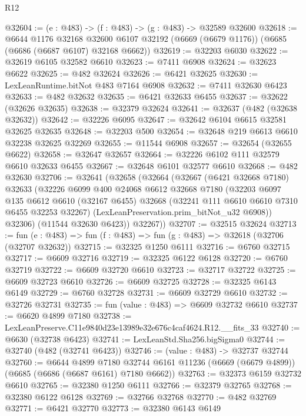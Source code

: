 \begin{lexlean}{R12}
\begin{coremodule}
@32604 := (e : @483) -> (f : @483) -> (g : @483) -> @32589 @32600
@32618 := @6644
    @1176
    @32168
    @32600
    @6107
    @32192
    (@6669 (@6679 @1176))
    (@6685 (@6686 (@6687 @6107) @32168 @6662))
@32619 := @32203 @6030
@32622 := @32619 @6105 @32582 @6610
@32623 := @7411 @6908
@32624 := @32623 @6622
@32625 := @482 @32624
@32626 := @6421 @32625
@32630 := LexLeanRuntime.bitNot @483 @7164 @6908
@32632 := @7411 @32630 @6423
@32633 := @482 @32632
@32635 := @6421 @32633 @6455
@32637 := @32622 (@32626 @32635)
@32638 := @32379 @32624
@32641 := @32637 (@482 (@32638 @32632))
@32642 := @32226 @6095
@32647 := @32642 @6104 @6615 @32581 @32625 @32635
@32648 := @32203 @500
@32654 := @32648 @219 @6613 @6610 @32238 @32625 @32269
@32655 := @11544 @6908
@32657 := @32654 (@32655 @6622)
@32658 := @32647 @32657
@32664 := @32226 @6102 @111 @32579 @6610 @32633 @6455
@32667 := @32648 @6101 @32577 @6610
@32668 := @482 @32630
@32706 := @32641
    (@32658
      (@32664
        (@32667
          (@6421 @32668 @7180)
          @32633
          (@32226
            @6099
            @400
            @24068
            @6612
            @32668
            @7180
            (@32203
              @6097
              @135
              @6612
              @6610
              (@32167 @6455)
              @32668
              (@32241 @111 @6610 @6610 @7310 @6455 @32253 @32267)
              (LexLeanPreservation.prim_bitNot_u32 @6908))
            @32306)
          (@11544 @32630 @6423))
        @32267))
@32707 := @32515 @32624
@32713 := fun (e : @483) => fun (f : @483) => fun (g : @483) => @32618 (@32706 (@32707 @32632))
@32715 := @32325 @1250 @6111
@32716 := @6760 @32715
@32717 := @6609 @32716
@32719 := @32325 @6122 @6128
@32720 := @6760 @32719
@32722 := @6609 @32720 @6610
@32723 := @32717 @32722
@32725 := @6609 @32723 @6610
@32726 := @6609 @32725
@32728 := @32325 @6143 @6149
@32729 := @6760 @32728
@32731 := @6609 @32729 @6610
@32732 := @32726 @32731
@32735 := fun (value : @483) => @6609 @32732 @6610
@32737 := @6620 @4899 @7180
@32738 := LexLeanPreserve.C11e9840d23e13989e32e676c4caf4624.R12.__fits_33
@32740 := @6630 (@32738 @6423)
@32741 := LexLeanStd.Sha256.bigSigma0
@32744 := @32740 (@482 (@32741 @6423))
@32746 := (value : @483) -> @32737 @32744
@32760 := @6644
    @4899
    @7180
    @32744
    @6161
    @11236
    (@6669 (@6679 @4899))
    (@6685 (@6686 (@6687 @6161) @7180 @6662))
@32763 := @32373 @6159 @32732 @6610
@32765 := @32380 @1250 @6111
@32766 := @32379 @32765
@32768 := @32380 @6122 @6128
@32769 := @32766 @32768
@32770 := @482 @32769
@32771 := @6421 @32770
@32773 := @32380 @6143 @6149

\end{coremodule}
\end{lexlean}
